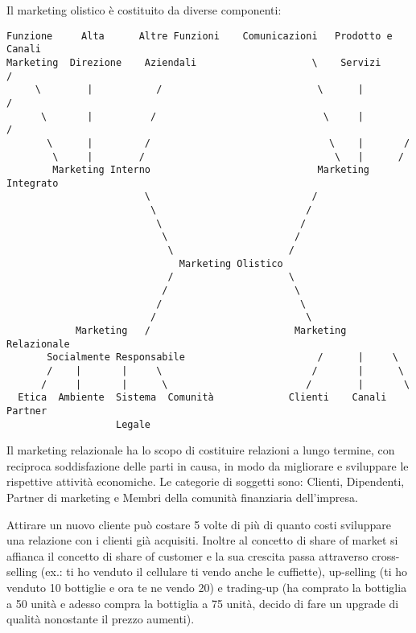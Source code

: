\documentclass[11pt]{article}
\begin{document}
Il marketing olistico è costituito da diverse componenti:
\begin{verbatim}
Funzione     Alta      Altre Funzioni    Comunicazioni   Prodotto e    Canali
Marketing  Direzione    Aziendali                    \    Servizi       /
     \        |           /                           \      |         /
      \       |          /                             \     |        /
       \      |         /                               \    |       /
        \     |        /                                 \   |      /
        Marketing Interno                             Marketing Integrato
                        \                            /
                         \                          /                           
                          \                        /
                           \                      /
                            \                    /
                              Marketing Olistico 
                            /                    \
                           /                      \
                          /                        \
                         /                          \
            Marketing   /                         Marketing Relazionale
       Socialmente Responsabile                       /      |     \
       /    |       |     \                          /       |      \
      /     |       |      \                        /        |       \
  Etica  Ambiente  Sistema  Comunità             Clienti    Canali     Partner
                   Legale                                                            
\end{verbatim}

Il marketing relazionale ha lo scopo di costituire relazioni a lungo termine, con reciproca soddisfazione delle parti in causa, in modo da migliorare e sviluppare le rispettive attività economiche. 
Le categorie di soggetti sono: Clienti, Dipendenti, Partner di marketing e Membri della comunità finanziaria dell'impresa. 

Attirare un nuovo cliente può costare 5 volte di più di quanto costi sviluppare una relazione con i clienti già acquisiti. Inoltre al concetto di share of market si affianca il concetto di share of customer e la sua crescita passa attraverso cross-selling (ex.: ti ho venduto il cellulare ti vendo anche le cuffiette), up-selling (ti ho venduto 10 bottiglie e ora te ne vendo 20) e trading-up (ha comprato la bottiglia a 50 unità e adesso compra la bottiglia a 75 unità, decido di fare un upgrade di qualità nonostante il prezzo aumenti). 
\end{document}
